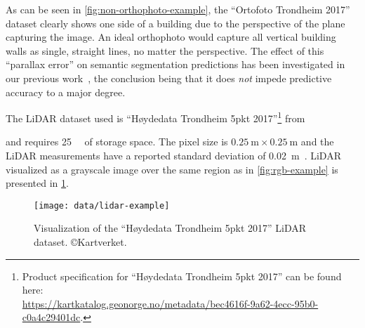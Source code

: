 As can be seen in \cref{fig:non-orthophoto-example}, the \enquote{Ortofoto Trondheim 2017} dataset clearly shows one side of a building due to the perspective of the plane capturing the image.
An ideal orthophoto would capture all vertical building walls as single, straight lines, no matter the perspective.
The effect of this \enquote{parallax error} on semantic segmentation predictions has been investigated in our previous work~\cite{specialization-project}, the conclusion being that it does \emph{not} impede predictive accuracy to a major degree.

The LiDAR dataset used is \enquote{Høydedata Trondheim 5pkt 2017}\footnote{Product specification for \enquote{Høydedata Trondheim 5pkt 2017} can be found here:\\ \url{https://kartkatalog.geonorge.no/metadata/bec4616f-9a62-4ecc-95b0-c0a4c29401dc}.} from \date{2017-10-10} and requires \SI{25}{\giga\byte} of storage space.
The pixel size is $\SI{0.25}{\meter} \times \SI{0.25}{\meter}$ and the LiDAR measurements have a reported standard deviation of \SI{0.02}{\meter}~\cite{trondheim_lidar_2017}.
LiDAR visualized as a grayscale image over the same region as in \cref{fig:rgb-example} is presented in \cref{fig:lidar-example}.

\begin{figure}[hbt]
  \centering
  \texttt{[image: data/lidar-example]}
  \caption[Visualization of LiDAR data from Trondheim.]{%
    Visualization of the \enquote{Høydedata Trondheim 5pkt 2017} LiDAR dataset.
    \copyright{Kartverket}.
  }%
  \label{fig:lidar-example}
\end{figure}
